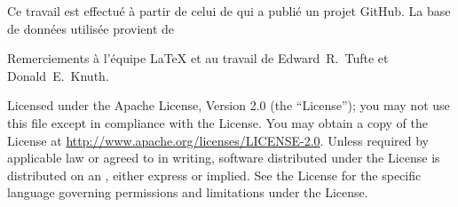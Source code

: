 
\par{}

Ce travail est effectué à partir de celui de  qui a publié 
un projet GitHub. La base de données utilisée provient de 

\par Remerciements à l'équipe \LaTeX{} et au travail de \mbox{Edward R.~Tufte} et \mbox{Donald E.~Knuth}.

\par Licensed under the Apache License, Version 2.0 (the ``License''); you may not
use this file except in compliance with the License. You may obtain a copy
of the License at \url{http://www.apache.org/licenses/LICENSE-2.0}. Unless
required by applicable law or agreed to in writing, software distributed
under the License is distributed on an , either express or implied. See the
License for the specific language governing permissions and limitations
under the License.
